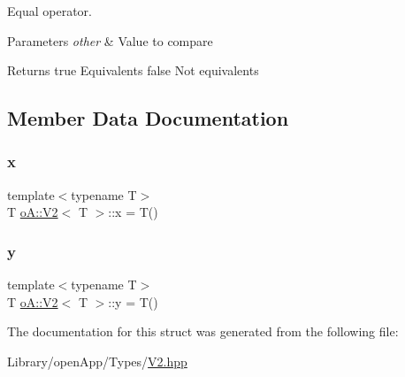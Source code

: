 Equal operator. 


\begin{DoxyParams}{Parameters}
{\em other} & Value to compare \\
\hline
\end{DoxyParams}
\begin{DoxyReturn}{Returns}
true Equivalents  false Not equivalents 
\end{DoxyReturn}


\subsection{Member Data Documentation}
\mbox{\label{structo_a_1_1_v2_ac1fdde8edfc1fdf4181450eb85795088}} 
\subsubsection{\texorpdfstring{x}{x}}
{\footnotesize\ttfamily template$<$typename T$>$ \\
T \mbox{\hyperlink{structo_a_1_1_v2}{o\+A\+::\+V2}}$<$ T $>$\+::x = T()}

\mbox{\label{structo_a_1_1_v2_a9437a06af6b8e5407e361b6bfc067225}} 
\subsubsection{\texorpdfstring{y}{y}}
{\footnotesize\ttfamily template$<$typename T$>$ \\
T \mbox{\hyperlink{structo_a_1_1_v2}{o\+A\+::\+V2}}$<$ T $>$\+::y = T()}



The documentation for this struct was generated from the following file\+:\begin{DoxyCompactItemize}
\item 
Library/open\+App/\+Types/\mbox{\hyperlink{_v2_8hpp}{V2.\+hpp}}\end{DoxyCompactItemize}
